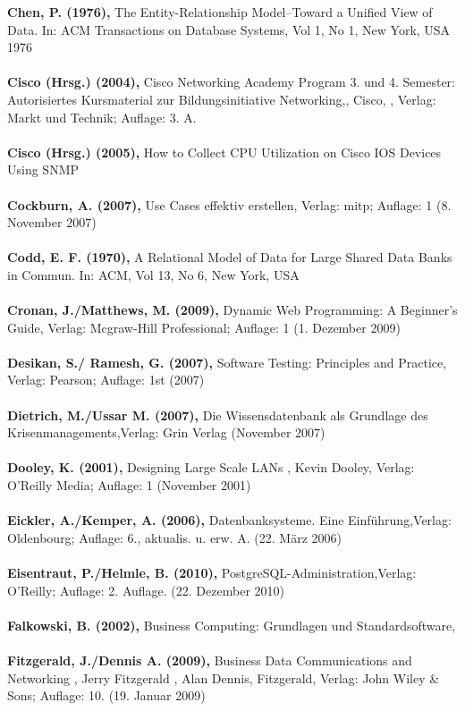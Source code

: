 \textbf{Chen, P. (1976),} The Entity-Relationship Model--Toward a Unified View of Data. In: ACM Transactions on Database Systems, Vol 1, No 1, New York, USA 1976\\\\
\textbf{Cisco (Hrsg.) (2004),} Cisco Networking Academy Program 3. und 4. Semester: Autorisiertes Kursmaterial zur Bildungsinitiative Networking,, Cisco, , Verlag: Markt und Technik; Auflage: 3. A. \\\\
\textbf{Cisco (Hrsg.) (2005),} How to Collect CPU Utilization on Cisco IOS Devices Using SNMP\\\\
\textbf{Cockburn, A. (2007),} Use Cases effektiv erstellen, Verlag: mitp; Auflage: 1 (8. November 2007)\\\\
\textbf{Codd, E. F. (1970),} A Relational Model of Data for Large Shared Data Banks in Commun. In: ACM, Vol 13, No 6, New York, USA\\\\
\textbf{Cronan, J./Matthews, M. (2009),} Dynamic Web Programming: A Beginner's Guide, Verlag: Mcgraw-Hill Professional; Auflage: 1 (1. Dezember 2009)\\\\
\textbf{Desikan, S./ Ramesh, G. (2007),} Software Testing: Principles and Practice, Verlag: Pearson; Auflage: 1st (2007)\\\\
\textbf{Dietrich, M./Ussar M. (2007),} Die Wissensdatenbank als Grundlage des Krisenmanagements,Verlag: Grin Verlag (November 2007)\\\\
\textbf{Dooley, K. (2001),} Designing Large Scale LANs , Kevin Dooley, Verlag: O'Reilly Media; Auflage: 1 (November 2001)\\\\
\textbf{Eickler, A./Kemper, A. (2006),} Datenbanksysteme. Eine Einführung,Verlag: Oldenbourg; Auflage: 6., aktualis. u. erw. A. (22. März 2006)\\\\
\textbf{Eisentraut, P./Helmle, B. (2010),} PostgreSQL-Administration,Verlag: O'Reilly; Auflage: 2. Auflage. (22. Dezember 2010)\\\\
\textbf{Falkowski, B. (2002),} Business Computing: Grundlagen und Standardsoftware, \\\\
\textbf{Fitzgerald, J./Dennis A. (2009),} Business Data Communications and Networking , Jerry Fitzgerald , Alan Dennis, Fitzgerald, Verlag: John Wiley \& Sons; Auflage: 10. (19. Januar 2009)\\\\
